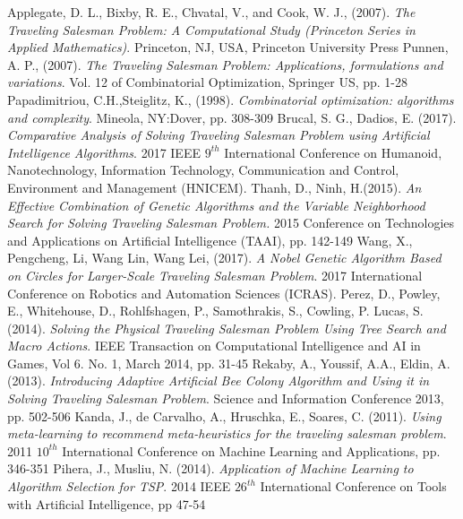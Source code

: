 \documentclass[twocolumn]{article}
\begin{document}
	\begin{thebibliography}{999}
		Applegate, D. L., Bixby, R. E., Chvatal, V.,  and Cook, W. J., (2007).
		\emph{The Traveling Salesman Problem: A Computational Study (Princeton Series in Applied Mathematics)}.
		Princeton, NJ, USA,
		Princeton University Press
		Punnen, A. P., (2007).
		\emph{The Traveling Salesman Problem: Applications, formulations and variations}.
		Vol. 12 of Combinatorial Optimization,
		Springer US,
		pp. 1-28
		Papadimitriou, C.H.,Steiglitz, K., (1998).
		\emph{Combinatorial optimization: algorithms and complexity}. Mineola, NY:Dover,
		pp. 308-309
		Brucal, S. G., Dadios, E. (2017).
		\emph{Comparative Analysis of Solving Traveling Salesman Problem using Artificial Intelligence Algorithms}.
		2017 IEEE $9^{th}$ International Conference on Humanoid, Nanotechnology, Information Technology, Communication and Control, Environment and Management (HNICEM).
		Thanh, D., Ninh, H.(2015).
		\emph{An Effective Combination of Genetic Algorithms and the Variable Neighborhood Search for Solving Traveling Salesman Problem.}
		2015 Conference on Technologies and Applications on Artificial Intelligence (TAAI),
		pp. 142-149
		Wang, X., Pengcheng, Li, Wang Lin, Wang Lei, (2017).
		\emph{A Nobel Genetic Algorithm Based on Circles for Larger-Scale Traveling Salesman Problem}. 2017 International Conference on Robotics and Automation Sciences (ICRAS).
		Perez, D., Powley, E., Whitehouse, D., Rohlfshagen, P., Samothrakis, S., Cowling, P. Lucas, S. (2014).
		\emph{Solving the Physical Traveling Salesman Problem Using Tree Search and Macro Actions}. IEEE Transaction on Computational Intelligence and AI in Games, Vol 6. No. 1, March 2014,
		pp. 31-45
		Rekaby, A., Youssif, A.A., Eldin, A. (2013).
		\emph{Introducing Adaptive Artificial Bee Colony Algorithm and Using it in Solving Traveling Salesman Problem}.
		Science and Information Conference 2013,
		pp. 502-506
		Kanda, J., de Carvalho, A., Hruschka, E., Soares, C. (2011).
		\emph{Using meta-learning to recommend meta-heuristics for the traveling salesman problem}. 2011 $10^{th}$ International Conference on Machine Learning and Applications,
		pp. 346-351
		Pihera, J., Musliu, N. (2014).
		\emph{Application of Machine Learning to Algorithm Selection for TSP}. 2014 IEEE $26^{th}$ International Conference on Tools with Artificial Intelligence,
		pp 47-54

\end{thebibliography}
\end{document}
